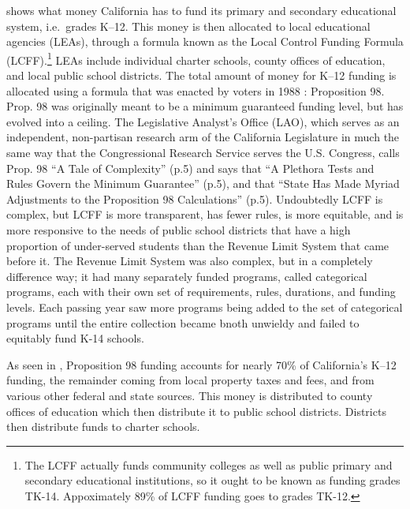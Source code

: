  shows what money California has to fund its primary and secondary educational system, i.e.~grades K–12. This money is then allocated to local educational agencies (LEAs), through a formula known as the Local Control Funding Formula (LCFF).\footnote{The LCFF actually funds community colleges as well as public primary and secondary educational institutions, so it ought to be known as funding grades TK-14. Appoximately 89\% of LCFF funding goes to grades TK-12.} LEAs include individual charter schools, county offices of education, and local public school districts. The total amount of money for K–12 funding is allocated using a formula that was enacted by voters in 1988 \parencite{LAO2017}: Proposition 98. Prop. 98 was originally meant to be a minimum guaranteed funding level, but has evolved into a ceiling. The Legislative Analyst's Office (LAO), which serves as an independent, non-partisan research arm of the California Legislature in much the same way that the Congressional Research Service serves the U.S. Congress, calls Prop. 98 ``A Tale of Complexity''  (p.5) and says that ``A Plethora Tests and Rules Govern the Minimum Guarantee'' (p.5), and that ``State Has Made Myriad Adjustments to the Proposition 98 Calculations'' (p.5). Undoubtedly LCFF is complex, but LCFF is more transparent, has fewer rules, is more equitable, and is more responsive to the needs of public school districts that have a high proportion of under-served students than the Revenue Limit System that came before it. The Revenue Limit System was also complex, but in a completely difference way; it had many separately funded programs, called categorical programs, each with their own set of requirements, rules, durations, and funding levels. Each passing year saw more programs being added to the set of categorical programs until the entire collection became bnoth unwieldy and failed to equitably fund K-14 schools.

As seen in , Proposition 98 funding accounts for nearly 70\% of California's K–12 funding, the remainder coming from local property taxes and fees, and from various other federal and state sources. This money is distributed to county offices of education which then distribute it to public school districts. Districts then distribute funds to charter schools.

